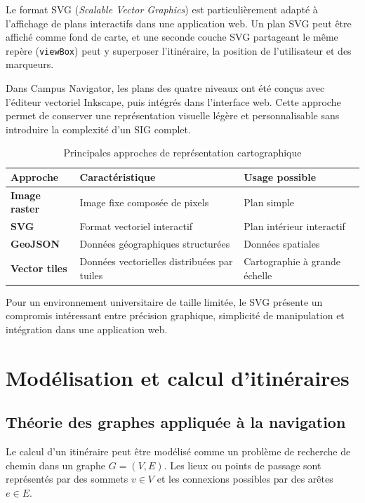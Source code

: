 \documentclass[12pt,a4paper]{report}
\begin{document}
Le format SVG (\emph{Scalable Vector Graphics}) est particulièrement adapté à l'affichage de plans
interactifs dans une application web. Un plan SVG peut être affiché comme fond de carte, et une
seconde couche SVG partageant le même repère (\texttt{viewBox}) peut y superposer l'itinéraire, la
position de l'utilisateur et des marqueurs.

Dans Campus Navigator, les plans des quatre niveaux ont été conçus avec l'éditeur vectoriel
Inkscape, puis intégrés dans l'interface web. Cette approche permet de conserver une
représentation visuelle légère et personnalisable sans introduire la complexité d'un SIG complet.

\begin{table}[h]
\centering
\caption{Principales approches de représentation cartographique}
\label{tab:carto}
\small
\begin{tabularx}{\linewidth}{@{}lXX@{}}
\toprule
\textbf{Approche} & \textbf{Caractéristique} & \textbf{Usage possible}\\
\midrule
\textbf{Image raster} & Image fixe composée de pixels & Plan simple\\
\textbf{SVG} & Format vectoriel interactif & Plan intérieur interactif\\
\textbf{GeoJSON} & Données géographiques structurées & Données spatiales\\
\textbf{Vector tiles} & Données vectorielles distribuées par tuiles & Cartographie à grande échelle\\
\bottomrule
\end{tabularx}
\end{table}

Pour un environnement universitaire de taille limitée, le SVG présente un compromis intéressant
entre précision graphique, simplicité de manipulation et intégration dans une application web.

\section{Modélisation et calcul d'itinéraires}

\subsection{Théorie des graphes appliquée à la navigation}

Le calcul d'un itinéraire peut être modélisé comme un problème de recherche de chemin dans un
graphe $G = (V, E)$. Les lieux ou points de passage sont représentés par des sommets $v \in V$ et
les connexions possibles par des arêtes $e \in E$.
\end{document}
